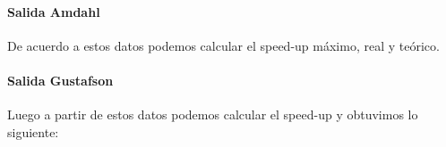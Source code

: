 \paragraph{Salida Amdahl}

    \def\text{Salida de los tiempos en serie y paralelo en milisegundos}
    \def\path{\model_amdahl_output_table.png}
    \def\scale{.6}
    

    De acuerdo a estos datos podemos calcular el speed-up máximo, real y teórico.

    \def\text{Speed-up real, teórico y máximo según la cantidad de threads}
    \def\path{\model_amdahl_speed_up_table.png}
    \def\scale{.6}
    

    \def\text{Gráfico}
    \def\path{\model_amdahl_speed_up.png}
    \def\scale{.6}
    

    \analisisAmdahl

    \newpage

\paragraph{Salida Gustafson}

    \def\text{Salida de los tiempos en serie y paralelo en milisegundos}
    \def\path{\model_gustafson_output_table.png}
    \def\scale{.6}
    

    \analisisGustafson

    \def\text{Tiempo paralelo y serie en función de la dimensión de las matrices de entrada}
    \def\path{\model_gustafson_exec_time.png}
    \def\scale{.6}
    

    \clearpage
    \newpage

    Luego a partir de estos datos podemos calcular el speed-up y obtuvimos lo
    siguiente:

    \def\text{Tabla de valores de la fracción de la parte secuencial y
    del speed-up escalable}
    \def\path{\model_gustafson_fixed_time_speed_up_table.png}
    \def\scale{.6}
    

    \def\text{Gráfico del speed-up en función de la parte secuencial.
    Se utilizó la ecuación \code{7}}
    \def\path{\model_gustafson_fixed_time_speed_up.png}
    \def\scale{.6}
    

    \def\text{Tabla de valores del speed-up}
    \def\path{\model_gustafson_real_speed_up_table.png}
    \def\scale{.6}
    

    \def\text{Gráfico del speed-up. Se utilizó la ecuación \code{2}}
    \def\path{\model_gustafson_real_speed_up.png}
    \def\scale{.6}
    
